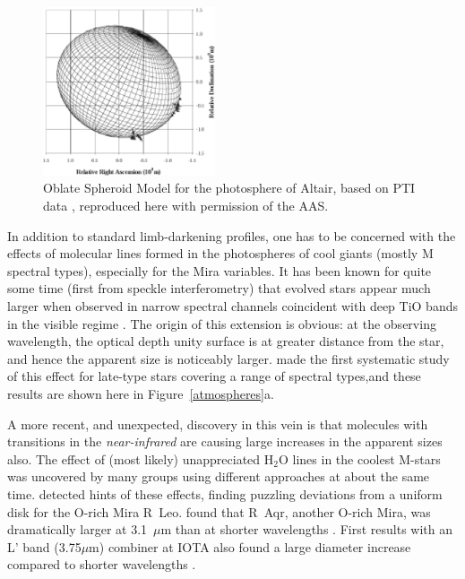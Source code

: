 \documentclass[12pt]{iopart}
\begin{document}
\begin{figure}[tbhp]
\begin{center}
\includegraphics[clip,angle=0,width=2.0in]{Figures/JDM_vanbelle.altair.eps}
\caption{\footnotesize Oblate Spheroid Model for the photosphere
of Altair, based on PTI data  
\citep[from Figure~6 of][]{vanbelle2001}, reproduced here with
permission of the AAS.
\label{altair}}
\end{center}
\end{figure}

In addition to standard limb-darkening profiles, one has to be concerned
with the effects of molecular lines formed in the photospheres of cool
giants (mostly M spectral types), especially for the Mira variables.
It has been known for quite some time (first from speckle
interferometry) that evolved stars appear much larger when observed in
narrow spectral channels coincident with deep TiO bands in the visible
regime \citep[e.g.,][]{labeyrie1977}.  The origin of this extension is
obvious: at the observing wavelength, the optical depth unity surface
is at greater distance from the star, and hence the apparent size is
noticeably larger.  \citet{quirrenbach1993a} made the first systematic
study of this effect for late-type stars covering a range of spectral
types,and these results are shown here in Figure~\ref{atmospheres}a.

A more recent, and unexpected, discovery in this vein is that
molecules with transitions in the {\em near-infrared} are causing
large increases in the apparent sizes also.  The effect of (most
likely) unappreciated H$_2$O lines in the coolest M-stars was
uncovered by many groups using different approaches at about the same
time.  \citet{perrin1999} detected hints of these effects, finding
puzzling deviations from a uniform disk for the O-rich Mira R~Leo.
\citet{tuthill2000b} found that R~Aqr, another O-rich Mira, was
dramatically larger at 3.1~$\mu$m than at shorter wavelengths
\citep[an effect seen also in other O-rich Miras,][]{tuthill1999}.
First results with an L' band (3.75$\mu$m) combiner at IOTA also found
a large diameter increase compared to shorter wavelengths
\citep{mennesson1999}.  
\end{document}
